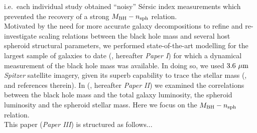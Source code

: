 \documentclass[preprint2]{emulateapj}
\begin{document}
i.e.~each individual study obtained ``noisy'' S\'ersic index measurements 
which prevented the recovery of a strong $M_{\rm BH} - n_{\rm sph}$ relation. \\
Motivated by the need for more accurate galaxy decompositions to refine and re-investigate scaling relations 
between the black hole mass and several host spheroid structural parameters, 
we performed state-of-the-art modelling for the largest sample of galaxies to date (\citealt{paperI}, hereafter \emph{Paper I})  
for which a dynamical measurement of the black hole mass was available.
In doing so, we used $3.6\rm~\mu m$ \emph{Spitzer} satellite imagery, 
given its superb capability to trace the stellar mass (\citealt{sheth2010}, and references therein). 
In \citeauthor{paperII} (\citeyear{paperII}, hereafter \emph{Paper II}) we examined the correlations between the black hole mass and 
the total galaxy luminosity, the spheroid luminosity and the spheroid stellar mass. 
Here we focus on the $M_{\rm BH} - n_{\rm sph}$ relation. \\
This paper (\emph{Paper III}) is structured as follows...
\end{document}

